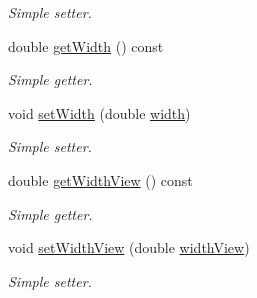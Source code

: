 \begin{DoxyCompactItemize}
\begin{DoxyCompactList}\small\item\em Simple setter. \end{DoxyCompactList}\item 
double \hyperlink{classWorld_ac5671c60bf3032e7786cb4a4b783ac03}{get\+Width} () const 
\begin{DoxyCompactList}\small\item\em Simple getter. \end{DoxyCompactList}\item 
void \hyperlink{classWorld_ae940c3db7c69cef5ab40547b20bd8747}{set\+Width} (double \hyperlink{classWorld_acbccb3a895843e63ed03d9a7f0ba04cf}{width})
\begin{DoxyCompactList}\small\item\em Simple setter. \end{DoxyCompactList}\item 
double \hyperlink{classWorld_a0c9a4b4d7430fc661d2c59ca001bcbfc}{get\+Width\+View} () const 
\begin{DoxyCompactList}\small\item\em Simple getter. \end{DoxyCompactList}\item 
void \hyperlink{classWorld_aa62c42795f5f1508491e5a3d9147c8e3}{set\+Width\+View} (double \hyperlink{classWorld_aa2de6ef451e67aac4bf028923083cd62}{width\+View})
\begin{DoxyCompactList}\small\item\em Simple setter. \end{DoxyCompactList}\end{DoxyCompactItemize}
